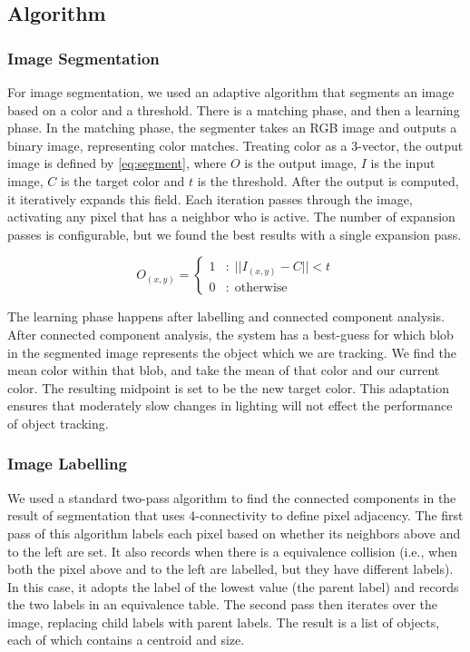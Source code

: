 
\subsection{Algorithm}
\subsubsection{Image Segmentation}
For image segmentation, we used an adaptive algorithm that segments an
image based on a color and a threshold. There is a matching phase, and
then a learning phase. In the matching phase, the segmenter takes an
RGB image and outputs a binary image, representing color
matches. Treating color as a 3-vector, the output image is defined by
\ref{eq:segment}, where $O$ is the output image, $I$ is the input
image, $C$ is the target color and $t$ is the threshold. After the
output is computed, it iteratively expands this field. Each iteration
passes through the image, activating any pixel that has a neighbor who
is active. The number of expansion passes is configurable, but we
found the best results with a single expansion pass.

\begin{equation}
  \label{eq:segment}
  O_{(x,y)} = \left\{ 
    \begin{array}{rl}
      1 &:\; || I_{(x,y)} - C || < t \\
      0 &:\; \mathrm{otherwise}
    \end{array} \right.
\end{equation}

The learning phase happens after labelling and connected component
analysis. After connected component analysis, the system has a
best-guess for which blob in the segmented image represents the object
which we are tracking. We find the mean color within that blob, and
take the mean of that color and our current color. The resulting
midpoint is set to be the new target color. This adaptation ensures
that moderately slow changes in lighting will not effect the
performance of object tracking.

\subsubsection{Image Labelling}
We used a standard two-pass algorithm to find the connected components
in the result of segmentation that uses 4-connectivity to define pixel
adjacency. The first pass of this algorithm labels each pixel based on
whether its neighbors above and to the left are set. It also records
when there is a equivalence collision (i.e., when both the pixel above
and to the left are labelled, but they have different labels). In this
case, it adopts the label of the lowest value (the parent label) and
records the two labels in an equivalence table. The second pass then
iterates over the image, replacing child labels with parent
labels. The result is a list of  objects, each of which
contains a centroid and size.

